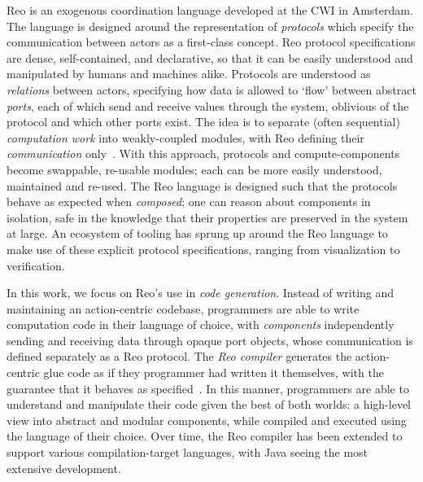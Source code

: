 Reo is an exogenous coordination language developed at the CWI in Amsterdam. The language is designed around the representation of \textit{protocols} which specify the communication between actors as a first-class concept. Reo protocol specifications are dense, self-contained, and declarative, so that it can be easily understood and manipulated by humans and machines alike. Protocols are understood as \textit{relations} between actors, specifying how data is allowed to `flow' between abstract \textit{ports}, each of which send and receive values through the system, oblivious of the protocol and which other ports exist. The idea is to separate (often sequential) \textit{computation work} into weakly-coupled modules, with Reo defining their \textit{communication} only~\cite{arbab2004reo}. With this approach, protocols and compute-components become swappable, re-usable modules; each can be more easily understood, maintained and re-used. The Reo language is designed such that the protocols behave as expected when \textit{composed}; one can reason about components in isolation, safe in the knowledge that their properties are preserved in the system at large. An ecosystem of tooling has sprung up around the Reo language to make use of these explicit protocol specifications, ranging from visualization to verification. 

In this work, we focus on Reo's use in \textit{code generation}. Instead of writing and maintaining an action-centric codebase, programmers are able to write computation code in their language of choice, with \textit{components} independently sending and receiving data through opaque port objects, whose communication is defined separately as a Reo protocol. The \textit{Reo compiler} generates the action-centric glue code as if they programmer had written it themselves, with the guarantee that it behaves as specified~\cite{jongmans2013modularizing}. In this manner, programmers are able to understand and manipulate their code given the best of both worlds: a high-level view into abstract and modular components, while compiled and executed using the language of their choice. Over time, the Reo compiler has been extended to support various compilation-target languages, with Java seeing the most extensive development. 

